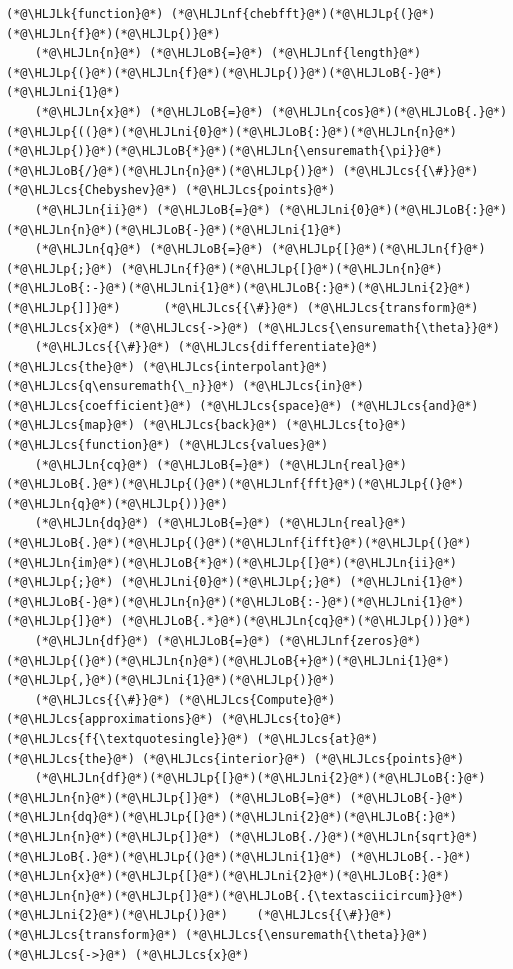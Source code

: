 \documentclass[12pt,a4paper]{article}
\newcommand{\HLJLk}[1]{\textcolor[RGB]{148,91,176}{\textbf{#1}}}
\newcommand{\HLJLn}[1]{#1}
\newcommand{\HLJLnf}[1]{\textcolor[RGB]{66,102,213}{#1}}
\newcommand{\HLJLni}[1]{\textcolor[RGB]{59,151,46}{#1}}
\newcommand{\HLJLoB}[1]{\textcolor[RGB]{102,102,102}{\textbf{#1}}}
\newcommand{\HLJLp}[1]{#1}
\newcommand{\HLJLcs}[1]{\textcolor[RGB]{153,153,119}{\textit{#1}}}
\begin{document}
\begin{lstlisting}
(*@\HLJLk{function}@*) (*@\HLJLnf{chebfft}@*)(*@\HLJLp{(}@*)(*@\HLJLn{f}@*)(*@\HLJLp{)}@*)
    (*@\HLJLn{n}@*) (*@\HLJLoB{=}@*) (*@\HLJLnf{length}@*)(*@\HLJLp{(}@*)(*@\HLJLn{f}@*)(*@\HLJLp{)}@*)(*@\HLJLoB{-}@*)(*@\HLJLni{1}@*)
    (*@\HLJLn{x}@*) (*@\HLJLoB{=}@*) (*@\HLJLn{cos}@*)(*@\HLJLoB{.}@*)(*@\HLJLp{((}@*)(*@\HLJLni{0}@*)(*@\HLJLoB{:}@*)(*@\HLJLn{n}@*)(*@\HLJLp{)}@*)(*@\HLJLoB{*}@*)(*@\HLJLn{\ensuremath{\pi}}@*)(*@\HLJLoB{/}@*)(*@\HLJLn{n}@*)(*@\HLJLp{)}@*) (*@\HLJLcs{{\#}}@*) (*@\HLJLcs{Chebyshev}@*) (*@\HLJLcs{points}@*)
    (*@\HLJLn{ii}@*) (*@\HLJLoB{=}@*) (*@\HLJLni{0}@*)(*@\HLJLoB{:}@*)(*@\HLJLn{n}@*)(*@\HLJLoB{-}@*)(*@\HLJLni{1}@*)
    (*@\HLJLn{q}@*) (*@\HLJLoB{=}@*) (*@\HLJLp{[}@*)(*@\HLJLn{f}@*)(*@\HLJLp{;}@*) (*@\HLJLn{f}@*)(*@\HLJLp{[}@*)(*@\HLJLn{n}@*)(*@\HLJLoB{:-}@*)(*@\HLJLni{1}@*)(*@\HLJLoB{:}@*)(*@\HLJLni{2}@*)(*@\HLJLp{]]}@*)      (*@\HLJLcs{{\#}}@*) (*@\HLJLcs{transform}@*) (*@\HLJLcs{x}@*) (*@\HLJLcs{->}@*) (*@\HLJLcs{\ensuremath{\theta}}@*)    
    (*@\HLJLcs{{\#}}@*) (*@\HLJLcs{differentiate}@*) (*@\HLJLcs{the}@*) (*@\HLJLcs{interpolant}@*) (*@\HLJLcs{q\ensuremath{\_n}}@*) (*@\HLJLcs{in}@*) (*@\HLJLcs{coefficient}@*) (*@\HLJLcs{space}@*) (*@\HLJLcs{and}@*) (*@\HLJLcs{map}@*) (*@\HLJLcs{back}@*) (*@\HLJLcs{to}@*) (*@\HLJLcs{function}@*) (*@\HLJLcs{values}@*)
    (*@\HLJLn{cq}@*) (*@\HLJLoB{=}@*) (*@\HLJLn{real}@*)(*@\HLJLoB{.}@*)(*@\HLJLp{(}@*)(*@\HLJLnf{fft}@*)(*@\HLJLp{(}@*)(*@\HLJLn{q}@*)(*@\HLJLp{))}@*)
    (*@\HLJLn{dq}@*) (*@\HLJLoB{=}@*) (*@\HLJLn{real}@*)(*@\HLJLoB{.}@*)(*@\HLJLp{(}@*)(*@\HLJLnf{ifft}@*)(*@\HLJLp{(}@*)(*@\HLJLn{im}@*)(*@\HLJLoB{*}@*)(*@\HLJLp{[}@*)(*@\HLJLn{ii}@*)(*@\HLJLp{;}@*) (*@\HLJLni{0}@*)(*@\HLJLp{;}@*) (*@\HLJLni{1}@*)(*@\HLJLoB{-}@*)(*@\HLJLn{n}@*)(*@\HLJLoB{:-}@*)(*@\HLJLni{1}@*)(*@\HLJLp{]}@*) (*@\HLJLoB{.*}@*)(*@\HLJLn{cq}@*)(*@\HLJLp{))}@*)
    (*@\HLJLn{df}@*) (*@\HLJLoB{=}@*) (*@\HLJLnf{zeros}@*)(*@\HLJLp{(}@*)(*@\HLJLn{n}@*)(*@\HLJLoB{+}@*)(*@\HLJLni{1}@*)(*@\HLJLp{,}@*)(*@\HLJLni{1}@*)(*@\HLJLp{)}@*)
    (*@\HLJLcs{{\#}}@*) (*@\HLJLcs{Compute}@*) (*@\HLJLcs{approximations}@*) (*@\HLJLcs{to}@*) (*@\HLJLcs{f{\textquotesingle}}@*) (*@\HLJLcs{at}@*) (*@\HLJLcs{the}@*) (*@\HLJLcs{interior}@*) (*@\HLJLcs{points}@*)
    (*@\HLJLn{df}@*)(*@\HLJLp{[}@*)(*@\HLJLni{2}@*)(*@\HLJLoB{:}@*)(*@\HLJLn{n}@*)(*@\HLJLp{]}@*) (*@\HLJLoB{=}@*) (*@\HLJLoB{-}@*)(*@\HLJLn{dq}@*)(*@\HLJLp{[}@*)(*@\HLJLni{2}@*)(*@\HLJLoB{:}@*)(*@\HLJLn{n}@*)(*@\HLJLp{]}@*) (*@\HLJLoB{./}@*)(*@\HLJLn{sqrt}@*)(*@\HLJLoB{.}@*)(*@\HLJLp{(}@*)(*@\HLJLni{1}@*) (*@\HLJLoB{.-}@*) (*@\HLJLn{x}@*)(*@\HLJLp{[}@*)(*@\HLJLni{2}@*)(*@\HLJLoB{:}@*)(*@\HLJLn{n}@*)(*@\HLJLp{]}@*)(*@\HLJLoB{.{\textasciicircum}}@*)(*@\HLJLni{2}@*)(*@\HLJLp{)}@*)    (*@\HLJLcs{{\#}}@*) (*@\HLJLcs{transform}@*) (*@\HLJLcs{\ensuremath{\theta}}@*) (*@\HLJLcs{->}@*) (*@\HLJLcs{x}@*)   

\end{lstlisting}
\end{document}
